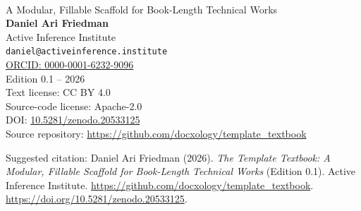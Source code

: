 \documentclass[
]{article}
\theoremstyle{plain}
\theoremstyle{definition}
\begin{document}
\\
{\large A Modular, Fillable Scaffold for Book-Length Technical Works}\\[1.2em]
{\Large\bfseries Daniel Ari Friedman}\\[0.35em]
{\normalsize Active Inference Institute}\\[0.25em]
{\normalsize\texttt{daniel@activeinference.institute}}\\[0.25em]
{\normalsize\href{https://orcid.org/0000-0001-6232-9096}{ORCID: 0000-0001-6232-9096}}\\[0.5em]
\vspace{1.0em}
\noindent Edition 0.1 -- 2026\\
\noindent Text license: CC BY 4.0\\
\noindent Source-code license: Apache-2.0\\
\noindent DOI: \href{https://doi.org/10.5281/zenodo.20533125}{10.5281/zenodo.20533125}\\
\noindent Source repository: \href{https://github.com/docxology/template_textbook}{https://github.com/docxology/template\_textbook}\\
\vspace{0.8em}
\begin{center}
\begingroup
\setlength{\fboxsep}{8pt}
\endgroup
\end{center}
\vspace{0.6em}
\noindent{}
\par
\vspace{1.0em}
\noindent Suggested citation: Daniel Ari Friedman (2026). \textit{The Template Textbook: A Modular, Fillable Scaffold for Book-Length Technical Works} (Edition 0.1). Active Inference Institute. \href{https://github.com/docxology/template_textbook}{https://github.com/docxology/template\_textbook}. \href{https://doi.org/10.5281/zenodo.20533125}{https://doi.org/10.5281/zenodo.20533125}.
\end{document}
